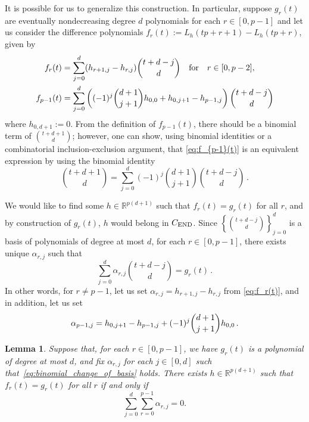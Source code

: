 \documentclass[12pt]{amsart}
\newtheorem{lemma}[thm]{Lemma}
\theoremstyle{definition}
\numberwithin{equation}{section}
\renewcommand\>{\rangle}
\newcommand\<{\langle}
\newcommand\0{\mathbf{0}}
\newcommand\RR{\mathbb{R}}
\newcommand\set[1]{\left\{#1\right\}}
\newcommand{\CEND}{C_\textnormal{END}}
\begin{document}
It is possible for us to generalize this construction. In particular, suppose $g_r(t)$ are eventually nondecreasing degree $d$ polynomials for each $r \in [0, p-1]$ and let us consider the difference polynomials $f_r(t) := L_h(tp+r+1) - L_h(tp+r)$, given by
\begin{align}
	f_r(t) &= \sum_{j=0}^d (h_{r+1,j} - h_{r,j}) \binom{t+d-j}{d} \quad \text{for} \quad  r \in [0,p-2],\label{eq:f_r(t)} \\
	f_{p-1}(t) &=  \sum_{j = 0}^d \left((-1)^j \binom{d+1}{j+1} h_{0,0} + h_{0,j+1} - h_{p-1,j}\right)\binom{t+d-j}{d} \label{eq:f_{p-1}(t)}
\end{align}
where $h_{0,d+1} := 0$. 
From the definition of $f_{p-1}(t)$, there should be a binomial term of $\binom{t+d+1}{d}$; however, one can show, using binomial identities or a combinatorial inclusion-exclusion argument, that \eqref{eq:f_{p-1}(t)} is an equivalent expression by using the binomial identity
\begin{equation}\label{eq:t+d+1}
	\binom{t+d+1}{d} = \sum_{j=0}^d (-1)^j \binom{d+1}{j+1} \binom{t+d-j}{d} \, .
\end{equation}

We would like to find some $h \in \RR^{p(d+1)}$ such that $f_r(t) = g_r(t)$ for all $r$, and by construction of $g_r(t)$, $h$ would belong in $\CEND$. Since $\set{\binom{t+d-j}{d}}_{j = 0}^d$ is a basis of polynomials of degree at most $d$, for each $r \in [0,p-1]$, there exists unique $\alpha_{r,j}$ such that 
\begin{equation}\label{eq:binomial_change_of_basis}
	\sum_{j=0}^d \alpha_{r,j} \binom{t+d-j}{d} = g_r(t)\, .
\end{equation}
In other words, for $r \neq p-1$, let us set $\alpha_{r,j} = h_{r+1, j} - h_{r,j}$ from \eqref{eq:f_r(t)}, and in addition, let us set 
\begin{equation}\label{eq:a_{p-1,j}}
	\alpha_{p-1,j} = h_{0,j+1} - h_{p-1,j} + (-1)^j\binom{d+1}{j+1}h_{0,0}\, .
\end{equation}

\begin{lemma}\label{l:specified_difference}
	Suppose that, for each $r \in [0,p-1]$, we have $g_r(t)$ is a polynomial of degree at most $d$, and fix $\alpha_{r,j}$ for each $j \in [0,d]$ such that~\eqref{eq:binomial_change_of_basis} holds. There exists $h \in \RR^{p(d+1)}$ such that $f_r(t) = g_r(t)$ for all $r$ if and only if 
	\[
		\sum_{j=0}^{d} \sum_{r=0}^{p-1} \alpha_{r,j} = 0.
	\]
\end{lemma}
\end{document}
